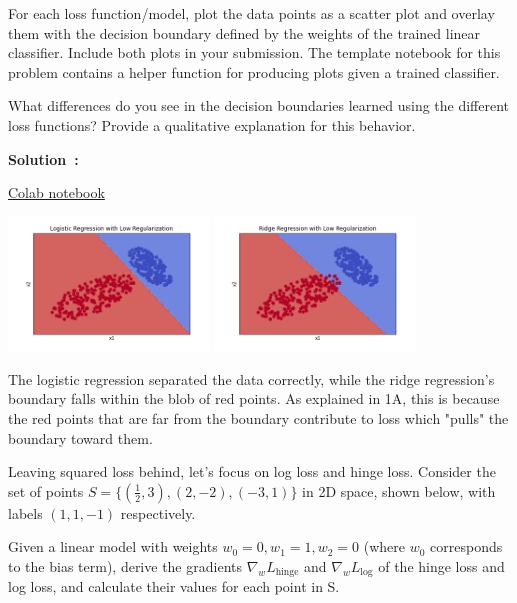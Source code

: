 \documentclass{article}
\newcounter{problem}[section]
\newenvironment{solution}[1][]
    {\par\medskip \begin{mdframed}\textbf{Solution~\Alph{problem}#1:} \begin{em}}
    {\end{em}\medskip\end{mdframed}\medskip}
\begin{document}
For each loss function/model, plot the data points as a scatter plot and overlay them with the decision boundary defined by the weights of the trained linear classifier.  Include both plots in your submission. The template notebook for this problem contains a helper function for producing plots given a trained classifier.

What differences do you see in the decision boundaries learned using the different loss functions? Provide a qualitative explanation for this behavior.

\begin{solution}
  \href{https://colab.research.google.com/drive/1u0q_P7XAgEKZ5jyB4yfnPg_flSxkUmv1?usp=sharing}{Colab notebook}

  \includegraphics[width=0.4\textwidth]{images/1b_logreg.png}
  \includegraphics[width=0.4\textwidth]{images/1b_ridge.png}

  The logistic regression separated the data correctly, while the ridge regression's boundary falls within the blob of red points.
  As explained in 1A, this is because the red points that are far from the boundary contribute to loss which "pulls" the boundary toward them.
\end{solution}

\problem[9]
Leaving squared loss behind, let's focus on log loss and hinge loss. Consider the set of points $S = \{(\frac{1}{2}, 3), (2, -2), (-3, 1)\}$ in 2D space, shown below, with labels $(1, 1, -1)$ respectively.

Given a linear model with weights $w_0 = 0, w_1 = 1, w_2 = 0$ (where $w_0$ corresponds to the bias term), derive the gradients $\nabla_{w}L_{\text{hinge}}$ and $\nabla_{w}L_{\text{log}}$ of the hinge loss and log loss, and calculate their values for each point in S.
\end{document}
